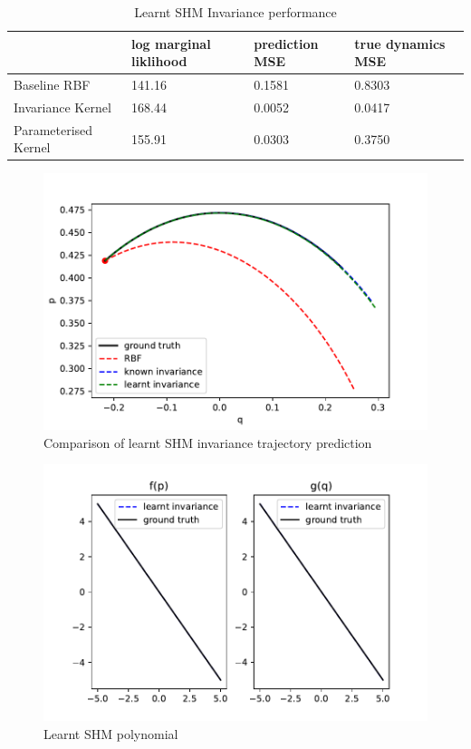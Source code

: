 \documentclass{statsmsc}
\begin{document}
\begin{table}[H]
  \centering
  \begin{tabular}{l l l l} 
                    \hline
                    & log marginal liklihood &  prediction MSE  & true dynamics MSE\\
                    \hline
Baseline RBF & 141.16 & 0.1581 & 0.8303 \\
Invariance Kernel & 168.44 & 0.0052 & 0.0417 \\
Parameterised Kernel & 155.91 & 0.0303 & 0.3750 \\
                    \hline
  \end{tabular}
  \caption{Learnt SHM Invariance performance }
  \label{tab:paramertised_shm_performance}
\end{table}

\begin{figure}[H] 
  \includegraphics[width=0.6\linewidth]{../codes/figures/parameterised_shm_predicted_trajectory.pdf}
  \centering
  \caption{Comparison of learnt SHM invariance trajectory prediction}
  \label{fig:parameterised_shm_trajectory}
\end{figure}

\begin{figure}[H] 
  \includegraphics[width=0.6\linewidth]{../codes/figures/parameterised_shm_learnt_polynomial.pdf}
  \centering
  \caption{Learnt SHM polynomial}
  \label{fig:parameterised_shm_polynomial}
\end{figure}
\end{document}
